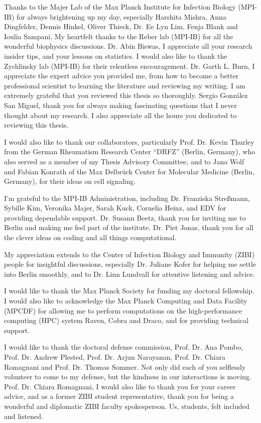 Thanks to the Majer Lab of the Max Planck Institute for Infection Biology (MPI-IB) for always brightening up my day, especially Harshita Mishra, Anna Dingfelder, Dennis Hinkel, Oliver Thieck, Dr. Ee Lyn Lim, Fenja Blank and Ioulia Sampani. My heartfelt thanks to the Reber lab (MPI-IB) for all the wonderful biophysics discussions. Dr. Abin Biswas, I appreciate all your research insider tips, and your lessons on statistics. I would also like to thank the Zychlinsky lab (MPI-IB) for their relentless encouragement. Dr. Garth L. Burn, I appreciate the expert advice you provided me, from how to become a better professional scientist to learning the literature and reviewing my writing. I am extremely grateful that you reviewed this thesis so thoroughly. Sergio González San Miguel, thank you for always making fascinating questions that I never thought about my research. I also appreciate all the hours you dedicated to reviewing this thesis. 

I would also like to thank our collaborators, particularly Prof. Dr. Kevin Thurley from the German Rheumatism Research Center “DRFZ” (Berlin, Germany), who also served as a member of my Thesis Advisory Committee, and to Jana Wolf and Fabian Konrath of the Max Delbrück Center for Molecular Medicine (Berlin, Germany), for their ideas on cell signaling.

I'm grateful to the MPI-IB Administration, including Dr. Franziska Streßmann, Sybille Kim, Veronika Majer, Sarah Kuck, Cornelia Heinz, and EDV for providing dependable support. Dr. Susann Beetz, thank you for inviting me to Berlin and making me feel part of the institute. Dr. Piet Jonas, thank you for all the clever ideas on coding and all things computational.

My appreciation extends to the Center of Infection Biology and Immunity (ZIBI) people for insightful discussions, especially Dr. Juliane Kofer for helping me settle into Berlin smoothly, and to Dr. Linn Lundvall for attentive listening and advice.

I would like to thank the Max Planck Society for funding my doctoral fellowship. I would also like to acknowledge the Max Planck Computing and Data Facility (MPCDF) for allowing me to perform computations on the high-performance computing (HPC) system Raven, Cobra and Draco, and for providing technical support.

I would like to thank the doctoral defense commission, Prof. Dr. Ana Pombo, Prof. Dr. Andrew Plested, Prof. Dr. Arjun Narayanan, Prof. Dr. Chiara Romagnani and Prof. Dr. Thomas Sommer. Not only did each of you selflessly volunteer to come to my defense, but the kindness in our interactions is moving. Prof. Dr. Chiara Romagnani, I would also like to thank you for your career advice, and as a former ZIBI student representative, thank you for being a wonderful and diplomatic ZIBI faculty spokesperson. Us, students, felt included and listened.

